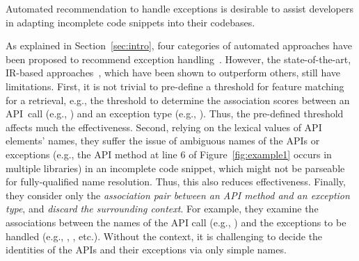 \begin{Observation} 
\label{ob1}
Automated recommendation to handle exceptions is desirable to
assist developers in adapting incomplete code snippets into their
codebases.
\end{Observation}


As explained in Section~\ref{sec:intro},  four
categories of automated approaches have been proposed to recommend
exception
handling~\cite{xrank-fse20,barbosa-bsse12,chanchal-scam14,barbosa-tse18,barbosa-tse16}.
However, the state-of-the-art, IR-based approaches~\cite{xrank-fse20},
which have been shown to outperform others, still have 
limitations. First, it is not trivial to pre-define a threshold for
feature matching for a retrieval, e.g., the threshold to determine the
association scores between an API~call (e.g., )
and an exception type (e.g., ). Thus,
the pre-defined threshold affects much the effectiveness.
%
Second, relying on the lexical values of API elements' names, they
suffer the issue of ambiguous names of the APIs or exceptions (e.g.,
the API method  at line 6 of Figure~\ref{fig:example1}
occurs in multiple libraries) in an incomplete code snippet, which
might not be parseable for fully-qualified name resolution. Thus, this
also reduces effectiveness. Finally, they consider only the {\em
  association pair between an API method and an exception type}, and
{\em discard the surrounding context}.
For example, they examine the associations between the names of the API
call (e.g., ) and the exceptions to be
handled (e.g., ,
, etc.). Without the context, it is
challenging to decide the identities of the APIs and their exceptions via
only simple names.

